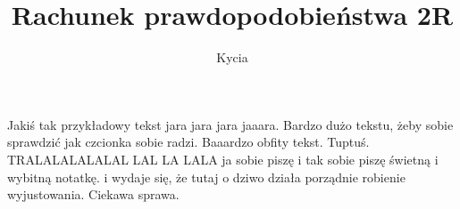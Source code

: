 \documentclass{article}
\title{Rachunek prawdopodobieństwa 2R}
\author{Kycia}
\date{}
\begin{document}
\maketitle

Jakiś tak przykładowy tekst jara jara jara jaaara. Bardzo dużo tekstu, żeby sobie sprawdzić jak czcionka sobie radzi. Baaardzo obfity tekst. Tuptuś. TRALALALALALAL LAL LA LALA ja sobie piszę i tak sobie piszę świetną i wybitną notatkę. i wydaje się, że tutaj o dziwo działa porządnie robienie wyjustowania. Ciekawa sprawa.
\end{document}

